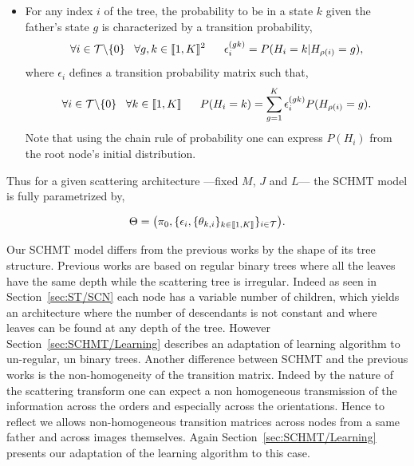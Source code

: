 \documentclass[a4paper,11pt]{report}
\begin{document}
\begin{itemize}
			\item For any index $i$ of the tree, the probability to be in a state $k$ given the father's state $g$ is characterized by a transition probability,
				\begin{equation}
					\forall i \in \mathcal{T} \backslash \{ 0 \} \;\;\; \forall g,k \in \llbracket1,K\rrbracket^{2}
					\;\;\;\;\;\; \epsilon_{i}^{(gk)} = P(H_{i}= k | H_{\rho(i)}=g), 
					\label{eq:SCHMT - Transition matrix}
				\end{equation}
				where $\epsilon_{i}$ defines a transition probability matrix such that,
				\begin{equation}
				  \forall i \in \mcalT \backslash\{0\} \;\;\;  \forall k \in \llbracket1,K\rrbracket
					\;\;\;\;\;\;  P(H_{i}=k) = \sum_{g=1}^{K} \epsilon_{i}^{(gk)} P(H_{\rho(i)}=g). %
				  \label{eq:SCHMT - State proba 1}
				\end{equation}
				Note that using the chain rule of probability one can express $P(H_{i})$ from the root node's initial distribution.\\
		\end{itemize}
		
		Thus for a given scattering architecture ---\ie fixed $M$, $J$ and $L$--- the SCHMT model is fully parametrized by,
		
		\begin{equation}
			\Theta = \big(\pi_{0}, \{ \epsilon_{i}, \{ \theta_{k,i} \}_{k\in\llbracket1,K\rrbracket} \}_{i\in\mathcal{T}}\big).
			\label{eq:SCHMT - parameters}
		\end{equation}
		
    Our SCHMT model differs from the previous works by the shape of its tree structure. Previous works are based on regular binary trees where all the leaves have the same depth while the scattering tree is irregular. Indeed as seen in Section~\ref{sec:ST/SCN} each node has a variable number of children, which yields an architecture where the number of descendants is not constant and where leaves can be found at any depth of the tree. However Section~\ref{sec:SCHMT/Learning} describes an adaptation of \citet{durand2004computational} learning algorithm to un-regular, un binary trees. Another difference between SCHMT and the previous works is the non-homogeneity of the transition matrix. Indeed by the nature of the scattering transform one can expect a non homogeneous transmission of the information across the orders and especially across the orientations. Hence to reflect we allows non-homogeneous transition matrices across nodes from a same father  and across images themselves. Again Section~\ref{sec:SCHMT/Learning} presents our adaptation of the learning algorithm to this case.\\
    
\end{document}
